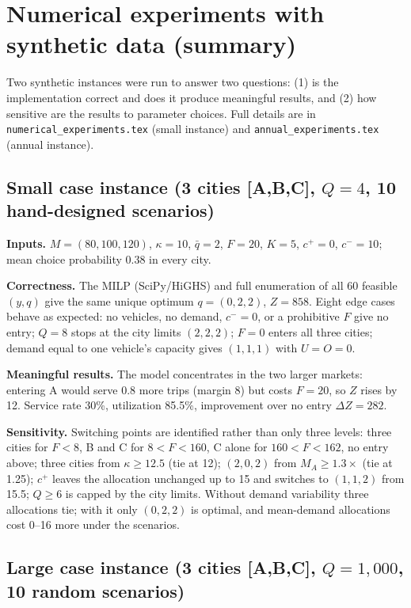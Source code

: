 \documentclass[10pt,a4paper]{article}
\begin{document}
\section{Numerical experiments with synthetic data (summary)}

Two synthetic instances were run to answer two questions: (1) is the implementation correct and does it
produce meaningful results, and (2) how sensitive are the results to parameter choices.
Full details are in \texttt{numerical\_experiments.tex} (small instance) and \texttt{annual\_experiments.tex} (annual instance).

\subsection{Small case instance (3 cities [A,B,C], $Q=4$, 10 hand-designed scenarios)}

\textbf{Inputs.} $M=(80,100,120)$, $\kappa=10$, $\bar q=2$, $F=20$, $K=5$, $c^+=0$, $c^-=10$; mean choice probability 0.38 in every city.

\textbf{Correctness.} The MILP (SciPy/HiGHS) and full enumeration of all 60 feasible $(y,q)$ give the same unique optimum $q=(0,2,2)$, $Z=858$.
Eight edge cases behave as expected: no vehicles, no demand, $c^-=0$, or a prohibitive $F$ give no entry; $Q=8$ stops at the city limits $(2,2,2)$;
$F=0$ enters all three cities; demand equal to one vehicle's capacity gives $(1,1,1)$ with $U=O=0$.

\textbf{Meaningful results.} The model concentrates in the two larger markets: entering A would serve 0.8 more trips (margin 8) but costs $F=20$, so $Z$ rises by 12.
Service rate 30\%, utilization 85.5\%, improvement over no entry $\Delta Z=282$.

\textbf{Sensitivity.} Switching points are identified rather than only three levels:
three cities for $F<8$, B and C for $8<F<160$, C alone for $160<F<162$, no entry above;
three cities from $\kappa\ge12.5$ (tie at 12); $(2,0,2)$ from $M_A\ge1.3\times$ (tie at 1.25);
$c^+$ leaves the allocation unchanged up to 15 and switches to $(1,1,2)$ from 15.5;
$Q\ge6$ is capped by the city limits. Without demand variability three allocations tie; with it only $(0,2,2)$ is optimal,
and mean-demand allocations cost 0--16 more under the scenarios.

\subsection{Large case instance (3 cities [A,B,C], $Q=1{,}000$, 10 random scenarios)}
\end{document}
